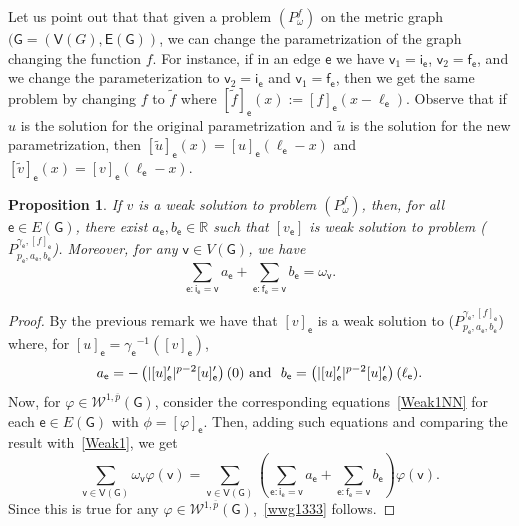 \documentclass[reqno,12pt]{amsart}
\newtheorem{proposition}[theorem]{Proposition}
\def\R{\mathbb R} %
\def\e{\mathsf{e}} 	%
\def\v{\mathsf{v}}	%
\newcommand{\vi}{\mathsf{i}} %
\newcommand{\vf}{\mathsf{f}} %
\newcommand{\G}{\mathsf{G}}	%
\newcommand{\V}{\mathsf{V}}	%
\newcommand{\E}{\mathsf{E}}	%
\numberwithin{equation}{section} %
\begin{document}
  Let us point out that that given a problem  $(P_{\omega}^f)$ on the metric graph $(\G = (\V(G), \E(\G))$, we can change the parametrization of the graph changing the function $f$. For instance, if in an edge $\e$ we have  $\v_1=\vi_\e$, $\v_2=\vf_\e$, and we change the parameterization to  $\v_2=\vi_\e$ and $\v_1=\vf_\e$, then we get the same problem by changing $f$ to $\tilde{f}$  where $[\tilde{f}]_\e(x):= [f]_\e(x - \ell_\e)$.  Observe that if $u$ is the solution for the original parametrization and $\tilde u$ is the solution for the new parametrization, then $[\tilde u]_\e(x)=[u]_\e(\ell_\e-x)$ and $[\tilde v]_\e(x)=[v]_\e(\ell_\e-x)$.

 \begin{proposition}\label{lemma2} If $v$ is a weak solution  to problem $(P_{\omega}^f)$, then, for all $\e \in E(\G)$, there exist $a_{\e},b_{\e} \in \R$  such that $[v_\e]$  is weak solution to problem ($P_{p_\e,a_\e,b_\e}^{\gamma_\e,[f]_\e}$).   Moreover, for any $\v \in V(\G)$, we have
\begin{equation}\label{wwg1333}\sum_{\e:\vi_\e=\v}a_\e+\sum_{\e:\vf_\e=\v}b_\e=\omega_\v.
\end{equation}
\end{proposition}

\begin{proof}  
 By the previous remark we have that $[v]_\e$ is a weak solution to ($P_{p_\e,a_\e,b_\e}^{\gamma_\e,[f]_\e}$) where, for $[u]_\e=\gamma_\e{}^{-1}([v]_\e)$,
$$a_\e=-\left(\vert [u]_\e'\vert^{p-2} [u]_\e' \right)(0) \ \hbox {and } \ b_\e=\left(\vert [u]_\e'\vert^{p-2} [u]_\e' \right)(\ell_\e).$$ Now, for $\varphi\in \mathcal{W}^{1,\overline{p}}(\G)$,  consider the corresponding equations~\eqref{Weak1NN} for each $\e\in E(\G)$ with $\phi=[\varphi]_\e$. Then, adding such equations and comparing the result with~\eqref{Weak1}, we get
$$\sum_{\v\in \V(\G)}\omega_\v\varphi(\v)=\sum_{\v\in \V(\G)}\left(\sum_{\e:\vi_\e=\v}a_\e+\sum_{\e:\vf_\e=\v}b_\e\right)\varphi(\v).
$$
Since this is true for any $\varphi\in \mathcal{W}^{1,\overline{p}}(\G)$,~\eqref{wwg1333} follows.
\end{proof}
\end{document}
